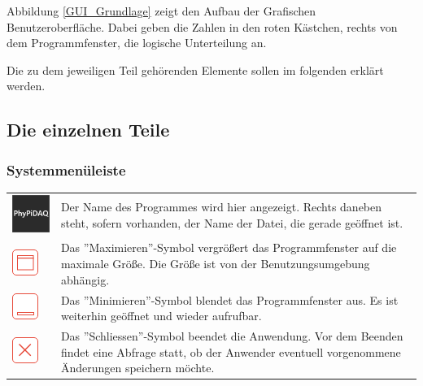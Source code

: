 \documentclass[parskip=full]{scrartcl}
\begin{document}
Abbildung \ref{GUI_Grundlage} zeigt den Aufbau der Grafischen Benutzeroberfläche. Dabei geben die Zahlen in den roten Kästchen, rechts von dem Programmfenster, die logische Unterteilung an.

Die zu dem jeweiligen Teil gehörenden Elemente sollen im folgenden erklärt werden.

\subsection{Die einzelnen Teile}

\subsubsection{Systemmenüleiste}

\begin{tabular}[t]{p{1cm} p{10cm}}
	\vspace{0cm}\includegraphics[width = 1 cm]{Grafik/PhyPiDAQ.png} & Der Name des Programmes wird hier angezeigt. Rechts daneben steht, sofern vorhanden, der Name der Datei, die gerade geöffnet ist.\newline\\
	\vspace{0cm}\includegraphics[width = 1 cm]{Grafik/Maximieren.png} & Das ''Maximieren''-Symbol vergrößert das Programmfenster auf die maximale Größe. Die Größe ist von der Benutzungsumgebung abhängig.\newline\\
	\vspace{0cm}\includegraphics[width = 1 cm]{Grafik/Minimieren.png} & Das ''Minimieren''-Symbol blendet das Programmfenster aus. Es ist weiterhin geöffnet und wieder aufrufbar. \\
	\vspace{0cm}\includegraphics[width = 1 cm]{Grafik/Schliessen.png} & Das ''Schliessen''-Symbol beendet die Anwendung. Vor dem Beenden findet eine Abfrage statt, ob der Anwender eventuell vorgenommene Änderungen speichern möchte.\\
\end{tabular}
\end{document}
